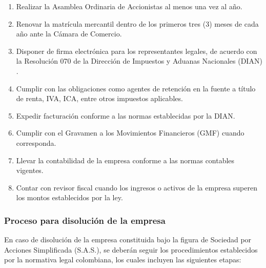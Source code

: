 \begin{enumerate}
	\item Realizar la Asamblea Ordinaria de Accionistas al menos una vez al año.

	\item Renovar la matrícula mercantil dentro de los primeros tres (3) meses de cada año ante la Cámara de Comercio.

	\item Disponer de firma electrónica para los representantes legales, de acuerdo con la Resolución 070 de la Dirección de Impuestos y Aduanas Nacionales (DIAN) \parencite{Resolucion70}.

	\item Cumplir con las obligaciones como agentes de retención en la fuente a título de renta, IVA, ICA, entre otros impuestos aplicables.

	\item Expedir facturación conforme a las normas establecidas por la DIAN.

	\item Cumplir con el Gravamen a los Movimientos Financieros (GMF) cuando corresponda.

	\item Llevar la contabilidad de la empresa conforme a las normas contables vigentes.

	\item Contar con revisor fiscal cuando los ingresos o activos de la empresa superen los montos establecidos por la ley.
\end{enumerate}

{}
\subsubsection*{Proceso para disolución de la empresa}


En caso de disolución de la empresa constituida bajo la figura de Sociedad por Acciones Simplificada (S.A.S.), se deberán seguir los procedimientos establecidos por la normativa legal colombiana, los cuales incluyen las siguientes etapas:

